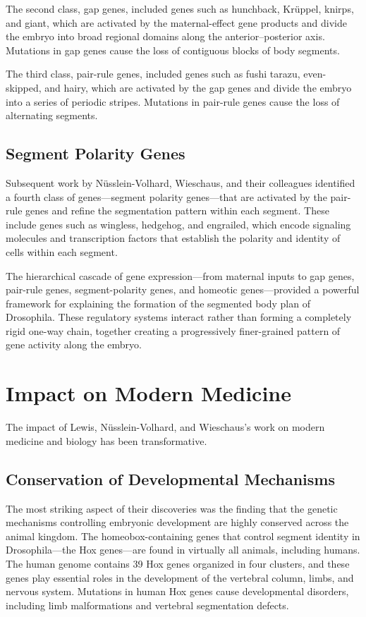 The second class, gap genes, included genes such as hunchback, Kr\"uppel, knirps, and giant, which are activated by the maternal-effect gene products and divide the embryo into broad regional domains along the anterior--posterior axis. Mutations in gap genes cause the loss of contiguous blocks of body segments.

The third class, pair-rule genes, included genes such as fushi tarazu, even-skipped, and hairy, which are activated by the gap genes and divide the embryo into a series of periodic stripes. Mutations in pair-rule genes cause the loss of alternating segments.

\subsection{Segment Polarity Genes}

Subsequent work by N\"usslein-Volhard, Wieschaus, and their colleagues identified a fourth class of genes---segment polarity genes---that are activated by the pair-rule genes and refine the segmentation pattern within each segment. These include genes such as wingless, hedgehog, and engrailed, which encode signaling molecules and transcription factors that establish the polarity and identity of cells within each segment.

The hierarchical cascade of gene expression---from maternal inputs to gap genes, pair-rule genes, segment-polarity genes, and homeotic genes---provided a powerful framework for explaining the formation of the segmented body plan of Drosophila. These regulatory systems interact rather than forming a completely rigid one-way chain, together creating a progressively finer-grained pattern of gene activity along the embryo.

\section{Impact on Modern Medicine}

The impact of Lewis, N\"usslein-Volhard, and Wieschaus's work on modern medicine and biology has been transformative.

\subsection{Conservation of Developmental Mechanisms}

The most striking aspect of their discoveries was the finding that the genetic mechanisms controlling embryonic development are highly conserved across the animal kingdom. The homeobox-containing genes that control segment identity in Drosophila---the Hox genes---are found in virtually all animals, including humans. The human genome contains 39 Hox genes organized in four clusters, and these genes play essential roles in the development of the vertebral column, limbs, and nervous system. Mutations in human Hox genes cause developmental disorders, including limb malformations and vertebral segmentation defects.


